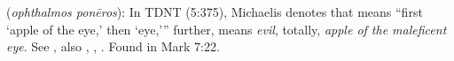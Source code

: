\item[Maleficent eye,]

(\textit{ophthalmos ponēros}):
In TDNT (5:375), Michaelis denotes that  means ``first `apple of the eye,' then `eye,''' further,  means \emph{evil}, totally, \emph{apple of the maleficent eye}. See , also , , .
Found in Mark 7:22.
